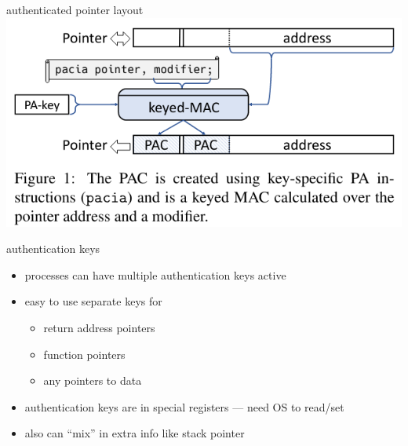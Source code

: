 \begin{frame}{authenticated pointer layout}
\includegraphics[width=\textwidth]{../cfi/arm-enc-ptr-fig}
\end{frame}

\begin{frame}{authentication keys}
    \begin{itemize}
    \item processes can have multiple authentication keys active
    \item easy to use separate keys for
        \begin{itemize}
        \item return address pointers
        \item function pointers
        \item any pointers to data
        \end{itemize}
    \item authentication keys are in special registers --- need OS to read/set
    \vspace{.5cm}
    \item also can ``mix'' in extra info like stack pointer
    \end{itemize}
\end{frame}
